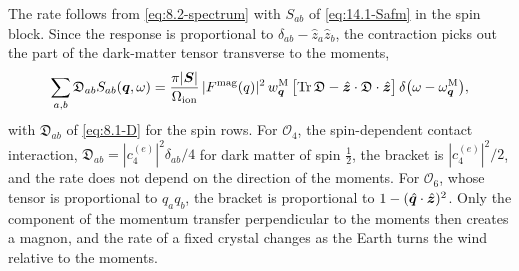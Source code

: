 The rate follows from \cref{eq:8.2-spectrum} with $S_{ab}$ of \cref{eq:14.1-Safm} in the spin block. Since the response is proportional to $\delta_{ab} - \hat z_a\hat z_b$, the contraction picks out the part of the dark-matter tensor transverse to the moments,
\begin{equation}
  \sum_{a,b}\mathfrak{D}_{ab}S_{ab}(\bm{q},\omega) = \frac{\pi|\bm{S}|}{\Omega_{\mathrm{ion}}}\,|F^{\mathrm{mag}}(q)|^2\,w^{\mathrm{M}}_{\bm{q}}\,\bigl[\operatorname{Tr}\mathfrak{D} - \hat{\bm{z}}\cdot\mathfrak{D}\cdot\hat{\bm{z}}\bigr]\,\delta\bigl(\omega - \omega^{\mathrm{M}}_{\bm{q}}\bigr) ,
  \label{eq:14.1-contract}
\end{equation}
with $\mathfrak{D}_{ab}$ of \cref{eq:8.1-D} for the spin rows. For $\mathcal{O}_4$, the spin-dependent contact interaction, $\mathfrak{D}_{ab} = |c_4^{(e)}|^2\delta_{ab}/4$ for dark matter of spin $\frac12$, the bracket is $|c_4^{(e)}|^2/2$, and the rate does not depend on the direction of the moments. For $\mathcal{O}_6$, whose tensor is proportional to $q_aq_b$, the bracket is proportional to $1 - (\hat{\bm{q}}\cdot\hat{\bm{z}})^2$. Only the component of the momentum transfer perpendicular to the moments then creates a magnon, and the rate of a fixed crystal changes as the Earth turns the wind relative to the moments.

